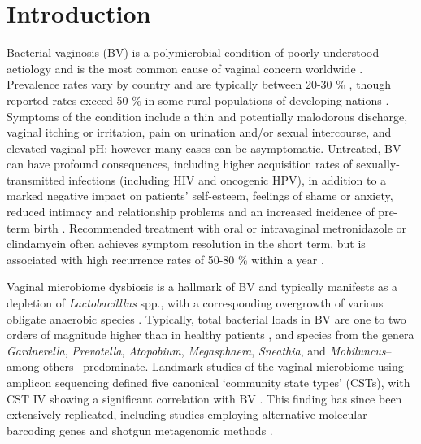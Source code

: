 \documentclass[sn-mathphys,Numbered]{sn-jnl}%
\begin{document}
\section{Introduction}\label{sec:secIntro}
Bacterial vaginosis (BV) is a polymicrobial condition of poorly-understood aetiology and is the most common cause of vaginal concern worldwide \citep{Srinivasan:2008}. Prevalence rates vary by country and are typically between 20-30 \% \citep{peebles_2019}, though reported rates exceed 50 \% in some rural populations of developing nations \citep{kenyon_global_2013}. Symptoms of the condition include a thin and potentially malodorous discharge, vaginal itching or irritation, pain on urination and/or sexual intercourse, and elevated vaginal pH; however many cases can be asymptomatic. Untreated, BV can have profound consequences, including higher acquisition rates of sexually-transmitted infections \citep{Allsworth:2011aa,Chacra:2023aa} (including HIV and oncogenic HPV), in addition to a marked negative impact on patients' self-esteem, feelings of shame or anxiety, reduced intimacy and relationship problems \citep{adolfsson_how_2016} and an increased incidence of pre-term birth \citep{Fettweis:2019aa}. Recommended treatment with oral or intravaginal metronidazole or clindamycin often achieves symptom resolution in the short term, but is associated with high recurrence rates of 50-80 \% within a year \citep{Oduyebo:2009}.

Vaginal microbiome dysbiosis is a hallmark of BV and typically manifests as a depletion of \textit{Lactobacilllus} spp., with a corresponding overgrowth of various obligate anaerobic species \citep{lev-sagie_vaginal_2022}. Typically, total bacterial loads in BV are one to two orders of magnitude higher than in healthy patients \citep{Zozaya:2010}, and species from the genera \textit{Gardnerella}, \textit{Prevotella}, \textit{Atopobium}, \textit{Megasphaera}, \textit{Sneathia}, and \textit{Mobiluncus}-- among others-- predominate. Landmark studies of the vaginal microbiome using amplicon sequencing defined five canonical `community state types' (CSTs), with CST IV showing a significant correlation with BV \citep{Ravel:2010}. This finding has since been extensively replicated, including studies employing alternative molecular barcoding genes \citep{albert_study_2015, dossantos_2023} and shotgun metagenomic methods \citep{symul_sub-communities_2023}.
\end{document}
